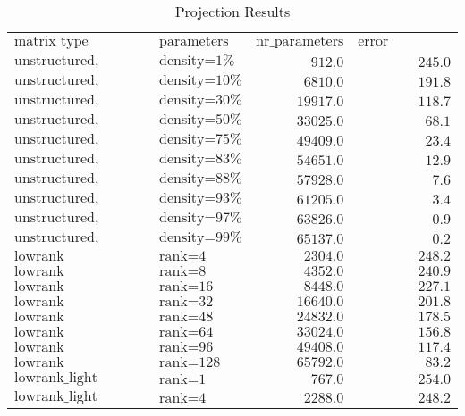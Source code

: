 \begin{table}[h!]
\centering
\tiny
\caption{Projection Results}
\label{tab:projection_table}
\begin{tabular}{llrr}
$\text{matrix type}$ & $\text{parameters}$ & $\text{nr\_parameters}$ & $\text{error (frobenius norm)}$\\
$\text{unstructured, magnitude pruned}$ & $\text{density=1\%}$ & $912.0$ & $245.0$\\
$\text{unstructured, magnitude pruned}$ & $\text{density=10\%}$ & $6810.0$ & $191.8$\\
$\text{unstructured, magnitude pruned}$ & $\text{density=30\%}$ & $19917.0$ & $118.7$\\
$\text{unstructured, magnitude pruned}$ & $\text{density=50\%}$ & $33025.0$ & $68.1$\\
$\text{unstructured, magnitude pruned}$ & $\text{density=75\%}$ & $49409.0$ & $23.4$\\
$\text{unstructured, magnitude pruned}$ & $\text{density=83\%}$ & $54651.0$ & $12.9$\\
$\text{unstructured, magnitude pruned}$ & $\text{density=88\%}$ & $57928.0$ & $7.6$\\
$\text{unstructured, magnitude pruned}$ & $\text{density=93\%}$ & $61205.0$ & $3.4$\\
$\text{unstructured, magnitude pruned}$ & $\text{density=97\%}$ & $63826.0$ & $0.9$\\
$\text{unstructured, magnitude pruned}$ & $\text{density=99\%}$ & $65137.0$ & $0.2$\\
$\text{lowrank}$ & $\text{rank=4}$ & $2304.0$ & $248.2$\\
$\text{lowrank}$ & $\text{rank=8}$ & $4352.0$ & $240.9$\\
$\text{lowrank}$ & $\text{rank=16}$ & $8448.0$ & $227.1$\\
$\text{lowrank}$ & $\text{rank=32}$ & $16640.0$ & $201.8$\\
$\text{lowrank}$ & $\text{rank=48}$ & $24832.0$ & $178.5$\\
$\text{lowrank}$ & $\text{rank=64}$ & $33024.0$ & $156.8$\\
$\text{lowrank}$ & $\text{rank=96}$ & $49408.0$ & $117.4$\\
$\text{lowrank}$ & $\text{rank=128}$ & $65792.0$ & $83.2$\\
$\text{lowrank\_light}$ & $\text{rank=1}$ & $767.0$ & $254.0$\\
$\text{lowrank\_light}$ & $\text{rank=4}$ & $2288.0$ & $248.2$\\

\end{tabular}
\end{table}
